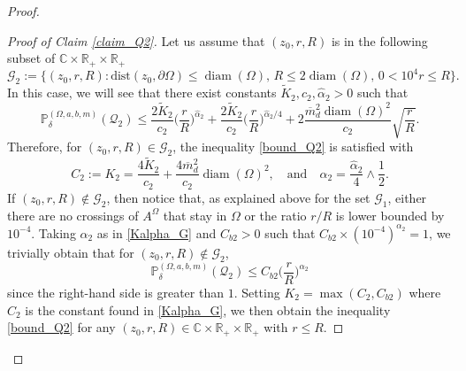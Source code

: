 \documentclass{article}
\newcommand{\PP}{{\mathbb{P}}}
\theoremstyle{definition}
\theoremstyle{remark}
\theoremstyle{remark}
\begin{document}
\begin{proof}
\begin{proof}[Proof of Claim \ref{claim_Q2}]
Let us assume that $(z_0, r, R)$ is in the following subset of $\mathbb{C} \times \mathbb{R}_{+} \times \mathbb{R}_{+}$
\begin{equation*}
    \mathcal{G}_2:= \{ (z_0, r, R): \text{dist}(z_0,\partial \Omega) \leq \operatorname{diam}(\Omega), \, R \leq 2\operatorname{diam}(\Omega), \, 0< 10^4r \leq R \}.
\end{equation*}
In this case, we will see that there exist constants $\tilde K_2, c_2, \hat \alpha_2 >0$ such that
\begin{equation} \label{crossing_good2}
    \PP_{\delta}^{(\Omega,a,b,m)}(\mathcal{Q}_2) \leq \frac{2\tilde K_2}{c_2}\bigg(\frac{r}{R}\bigg)^{\hat \alpha_2}
    + \frac{2\tilde K_2}{c_2}\bigg(\frac{r}{R} \bigg)^{\hat \alpha_2 /4}
    + 2\frac{\overline{m}_d^{2}\operatorname{diam}(\Omega)^2}{c_2}\sqrt{\frac{r}{R}}.
\end{equation}
Therefore, for $(z_0,r,R) \in \mathcal{G}_2$, the inequality \eqref{bound_Q2} is satisfied with
\begin{equation} \label{Kalpha_G}
    C_2:= K_2 = \frac{4\tilde K_2}{c_2} + \frac{4\overline{m}_d^2}{c_2}\operatorname{diam}(\Omega)^2, \quad \text{and} \quad \alpha_2 = \frac{\hat \alpha_2}{4} \wedge \frac{1}{2}.
\end{equation}
If $(z_0,r,R) \notin \mathcal{G}_2$, then notice that, as explained above for the set $\mathcal{G}_1$, either there are no crossings of $A^{\Omega}$ that stay in $\Omega$ or the ratio $r/R$ is lower bounded by $10^{-4}$. Taking $\alpha_2$ as in \eqref{Kalpha_G} and $C_{b2}>0$ such that $C_{b2}\times (10^{-4})^{\alpha_2}=1$, we trivially obtain that for $(z_0,r,R) \notin \mathcal{G}_2$,
\begin{equation*}
    \PP_{\delta}^{(\Omega,a,b,m)}(\mathcal{Q}_2) \leq C_{b2} \bigg( \frac{r}{R}\bigg)^{\alpha_2}
\end{equation*}
since the right-hand side is greater than $1$. Setting $K_2 = \max(C_2, C_{b2})$ where $C_2$ is the constant found in \eqref{Kalpha_G}, we then obtain the inequality \eqref{bound_Q2} for any $(z_0,r,R) \in \mathbb{C} \times \mathbb{R}_{+} \times \mathbb{R}_{+}$ with $r \leq R$.


\end{proof}
\end{proof}
\end{document}
